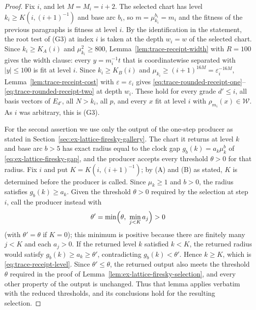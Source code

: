\begin{proof}
Fix $i$, and let $M=M_i=i+2$. The selected chart has level
$k_i\ge K(i,(i+1)^{-1})$ and base arc $b_i$, so
$m=\mu_{k_i}^{b_i}=m_i$ and the fitness of the previous paragraphs is
fitness at level $i$. By the identification in the statement, the root
test of (G3) at index $i$ is taken at the depth $w_i=w$ of the selected
chart. Since $k_i\ge K_A(i)$ and $\mu_{k_i}^2\ge800$,
Lemma~\ref{lem:trace-receipt-width} with $R=100$ gives the width clause:
every $y=m_i^{-1}t$ that is coordinatewise separated with $|y|\le100$ is
fit at level $i$. Since $k_i\ge K_B(i)$ and
$\mu_{k_i}\ge(i+1)^{16M}=\varepsilon_i^{-16M}$,
Lemma~\ref{lem:trace-receipt-cost} with $\varepsilon=\varepsilon_i$ gives
\eqref{eq:trace-rounded-receipt-one}--\eqref{eq:trace-rounded-receipt-two}
at depth $w_i$. These hold for every grade $d'\le i$, all basis vectors
of $E_{d'}$, all $N>k_i$, all $p$, and every $x$ fit at level $i$ with
$\rho_{m_i}(x)\in\mathcal W$. As $i$ was arbitrary, this is (G3).

For the second assertion we use only the output of the one-step producer
as stated in Section~\ref{sec:ex-lattice-firesky-gallery}. The chart it
returns at level $k$ and base arc $b>5$ has exact radius equal to the
clock gap $g_b(k)=a_k\mu_k^b$ of \eqref{eq:ex-lattice-firesky-gap}, and the
producer accepts every threshold $\theta>0$ for that radius. Fix $i$ and
put $K=K(i,(i+1)^{-1})$; by (A) and (B) as stated, $K$ is determined
before the producer is called. Since $\mu_k\ge1$ and $b>0$, the radius
satisfies $g_b(k)\ge a_k$. Given the threshold $\theta>0$ required by the
selection at step $i$, call the producer instead with
\[
 \theta'=\min\Bigl(\theta,\ \min_{j<K}a_j\Bigr)>0
\]
(with $\theta'=\theta$ if $K=0$); this minimum is positive because
there are finitely many $j<K$ and each $a_j>0$. If the returned level $k$
satisfied $k<K$, the returned radius would satisfy
$g_b(k)\ge a_k\ge\theta'$, contradicting $g_b(k)<\theta'$. Hence
$k\ge K$, which is \eqref{eq:trace-receipt-level}. Since
$\theta'\le\theta$, the returned output also meets the threshold $\theta$
required in the proof of Lemma~\ref{lem:ex-lattice-firesky-selection},
and every other property of the output is unchanged. Thus that lemma
applies verbatim with the reduced thresholds, and its conclusions hold
for the resulting selection.
\end{proof}


